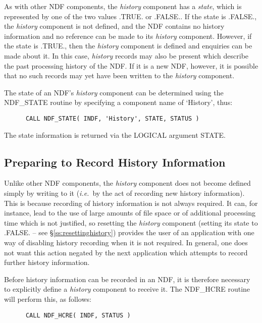 \documentclass[twoside,11pt]{article}
\newcommand{\htmlref}[2]{#1}
\newcommand{\xlabel}[1]{}
\newcommand{\st}[1]{{\em{#1}}}
\begin{document}
As with other NDF components, the \st{history\/} component has a
\st{state}, which is represented by one of the two values .TRUE. or 
.FALSE..  If the state is .FALSE., the \st{history\/} component is not
defined, and the NDF contains no history information and no reference
can be made to its \st{history\/} component. However, if the state is
.TRUE., then the \st{history\/} component is defined and enquiries can
be made about it. In this case, \st{history\/} records may also be present
which describe the past processing history of the NDF. If it is a new
NDF, however, it is possible that no such records may yet have been
written to the \st{history\/} component.

The state of an NDF's \st{history\/} component can be determined using
the \htmlref{NDF\_STATE}{NDF_STATE} routine by specifying a component name of `History',
thus:

\small
\begin{verbatim}
      CALL NDF_STATE( INDF, 'History', STATE, STATUS )
\end{verbatim}
\normalsize

The state information is returned via the LOGICAL argument STATE.

\subsection{\xlabel{preparing_to_record_history_information}\label{ss:historycreation}Preparing to Record History Information}

Unlike other NDF components, the \st{history\/} component does not
become defined simply by writing to it (\st{i.e.}\ by the act of
recording new history information). This is because recording of
history information is not always required.  It can, for instance,
lead to the use of large amounts of file space or of additional
processing time which is not justified, so resetting the \st{history\/}
component (setting its state to .FALSE. -- see
\S\ref{ss:resettinghistory}) provides the user of an application with
one way of disabling history recording when it is not required.
In general, one does not want this action negated by the next
application which attempts to record further history information.

Before history information can be recorded in an NDF, it is therefore
necessary to explicitly define a \st{history\/} component to receive it.
The \htmlref{NDF\_HCRE}{NDF_HCRE} routine will perform this, as follows:

\small
\begin{verbatim}
      CALL NDF_HCRE( INDF, STATUS )
\end{verbatim}
\normalsize
\end{document}

